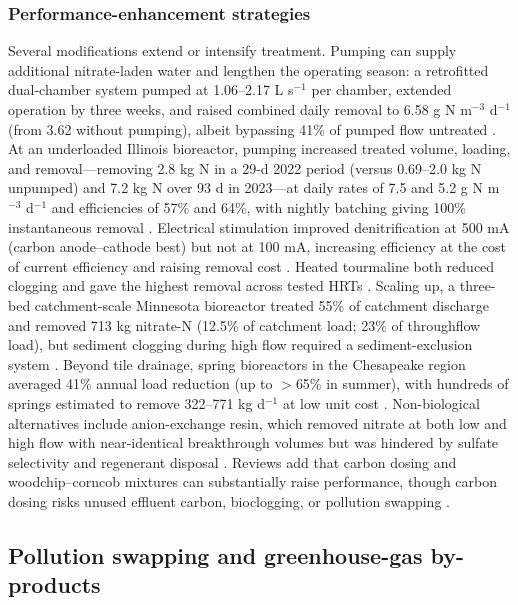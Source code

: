 \subsubsection{Performance-enhancement strategies}

Several modifications extend or intensify treatment. Pumping can supply additional nitrate-laden water and lengthen the operating season: a retrofitted dual-chamber system pumped at 1.06--2.17 L s$^{-1}$ per chamber, extended operation by three weeks, and raised combined daily removal to 6.58 g N m$^{-3}$ d$^{-1}$ (from 3.62 without pumping), albeit bypassing 41\% of pumped flow untreated \parencite{Hartfiel2023}. At an underloaded Illinois bioreactor, pumping increased treated volume, loading, and removal---removing 2.8 kg N in a 29-d 2022 period (versus 0.69--2.0 kg N unpumped) and 7.2 kg N over 93 d in 2023---at daily rates of 7.5 and 5.2 g N m$^{-3}$ d$^{-1}$ and efficiencies of 57\% and 64\%, with nightly batching giving 100\% instantaneous removal \parencite{DíazGarcía2025}. Electrical stimulation improved denitrification at 500 mA (carbon anode--cathode best) but not at 100 mA, increasing efficiency at the cost of current efficiency and raising removal cost \parencite{Law2018}. Heated tourmaline both reduced clogging and gave the highest removal across tested HRTs \parencite{Ma2021}. Scaling up, a three-bed catchment-scale Minnesota bioreactor treated 55\% of catchment discharge and removed 713 kg nitrate-N (12.5\% of catchment load; 23\% of throughflow load), but sediment clogging during high flow required a sediment-exclusion system \parencite{Feyereisen2023}. Beyond tile drainage, spring bioreactors in the Chesapeake region averaged 41\% annual load reduction (up to $>$65\% in summer), with hundreds of springs estimated to remove 322--771 kg d$^{-1}$ at low unit cost \parencite{Easton2019}. Non-biological alternatives include anion-exchange resin, which removed nitrate at both low and high flow with near-identical breakthrough volumes but was hindered by sulfate selectivity and regenerant disposal \parencite{MAGETTE1990}. Reviews add that carbon dosing and woodchip--corncob mixtures can substantially raise performance, though carbon dosing risks unused effluent carbon, bioclogging, or pollution swapping \parencite{Wang2025b}.

\subsection{Pollution swapping and greenhouse-gas by-products}

